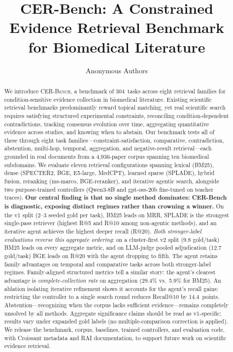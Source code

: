 \documentclass{article}
\title{CER-Bench: A Constrained\\ Evidence Retrieval Benchmark\\ for Biomedical Literature}
\author{Anonymous Authors}
\begin{document}
\maketitle

\begin{abstract}
We introduce \textsc{CER-Bench}, a benchmark of 304~tasks across eight retrieval families for condition-sensitive evidence collection in biomedical literature. Existing scientific retrieval benchmarks predominantly reward topical matching, yet real scientific search requires satisfying structured experimental constraints, reconciling condition-dependent contradictions, tracking consensus evolution over time, aggregating quantitative evidence across studies, and knowing when to abstain. Our benchmark tests all of these through eight task families---constraint-satisfaction, comparative, contradiction, abstention, multi-hop, temporal, aggregation, and negative-result retrieval---each grounded in real documents from a 4,936-paper corpus spanning ten biomedical subdomains. We evaluate eleven retrieval configurations spanning lexical (BM25), dense (SPECTER2, BGE, E5-large, MedCPT), learned sparse (SPLADE), hybrid fusion, reranking (ms-marco, BGE-reranker), and iterative agentic search, alongside two purpose-trained controllers (Qwen3-8B and gpt-oss-20b fine-tuned on teacher traces). \textbf{Our central finding is that no single method dominates: CER-Bench is diagnostic, exposing distinct regimes rather than crowning a winner.} On the v1 split (2--3 seeded gold per task), BM25 leads on MRR, SPLADE is the strongest single-pass retriever (highest R@5 and R@10 among non-agentic methods), and an iterative agent achieves the highest deeper recall (R@20). \emph{Both stronger-label evaluations reverse this aggregate ordering}: on a cluster-first v2 split (9.8 gold/task) BM25 leads on every aggregate metric, and on LLM-judge pooled adjudication (12.7 gold/task) BGE leads on R@20 with the agent dropping to fifth. The agent retains family advantages on temporal and comparative tasks across both stronger-label regimes. Family-aligned structured metrics tell a similar story: the agent's clearest advantage is \emph{complete-collection rate} on aggregation (29.4\% vs.\ 5.9\% for BM25). An ablation isolating iterative refinement shows it accounts for the agent's recall gains: restricting the controller to a single search round reduces Recall@10 by 14.4~points. Abstention---recognizing when the corpus lacks sufficient evidence---remains completely unsolved by all methods. Aggregate significance claims should be read as v1-specific; results vary under expanded gold labels (no multiple-comparison correction is applied). We release the benchmark, corpus, baselines, trained controllers, and evaluation code, with Croissant metadata and RAI documentation, to support future work on scientific evidence retrieval.
\end{abstract}
\end{document}
